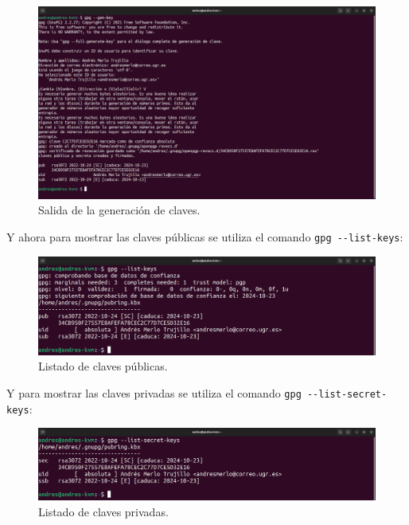 \documentclass{article}
\begin{document}
\begin{figure}[H]
    \includegraphics[width=\textwidth]{imagenes/Portatil/Captura desde 2022-10-24 11-46-02.png}
    \caption{Salida de la generación de claves.}
\end{figure}

\newpage

Y ahora para mostrar las claves públicas se utiliza el comando \verb|gpg --list-keys|:

\begin{figure}[H]
    \includegraphics[width=\textwidth]{imagenes/Portatil/Captura desde 2022-10-24 11-46-16.png}
    \caption{Listado de claves públicas.}
\end{figure}

Y para mostrar las claves privadas se utiliza el comando \verb|gpg --list-secret-keys|:

\begin{figure}[H]
    \includegraphics[width=\textwidth]{imagenes/Portatil/Captura desde 2022-10-24 11-46-25.png}
    \caption{Listado de claves privadas.}
\end{figure}
\end{document}
